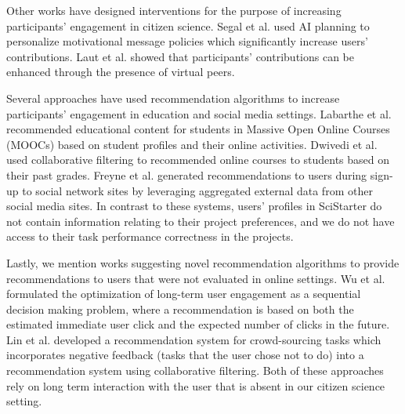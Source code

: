 \documentclass[letterpaper]{article} %
\begin{document}
Other works have designed interventions for the purpose of  increasing  participants' engagement in citizen science.
Segal et al.   used AI planning to  personalize  motivational message 
policies which significantly increase users’ contributions. 
Laut et al.   showed that participants’ contributions can be enhanced through the presence of virtual peers.

 
 
Several approaches have used recommendation algorithms to increase participants'  engagement   in education and social media settings. Labarthe et al.  recommended educational content 
for students in Massive Open Online Courses (MOOCs)   based on student profiles and their online activities.    Dwivedi et al.  used collaborative filtering to  recommended  online courses to students based on their past grades.  Freyne et al.  generated  recommendations to users during sign-up 
to social network sites by leveraging aggregated external data from other
social media sites.  
In contrast to these systems, users' profiles in SciStarter do not contain 
information relating to their project  preferences, and we do not have access to their 
task performance correctness in the projects. 

Lastly, we mention works suggesting novel recommendation algorithms to provide 
recommendations to users that were not evaluated in online settings. 
Wu et al.   formulated the optimization of long-term user engagement as a sequential decision making problem, where a recommendation is based on both the estimated immediate user click and the expected number of clicks  in the future.
Lin et al.  developed a recommendation system for crowd-sourcing tasks which incorporates negative   feedback (tasks that the user chose not to do) into a recommendation system using collaborative filtering.  Both of these approaches 
rely on long term interaction with the user that is absent in our citizen science setting. 
\end{document}
